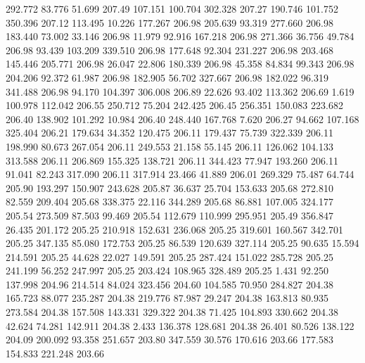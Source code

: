  292.772   83.776   51.699       207.49
 107.151  100.704  302.328       207.27
 190.746  101.752  350.396       207.12
 113.495   10.226  177.267       206.98
 205.639   93.319  277.660       206.98
 183.440   73.002   33.146       206.98
  11.979   92.916  167.218       206.98
 271.366   36.756   49.784       206.98
  93.439  103.209  339.510       206.98
 177.648   92.304  231.227       206.98
 203.468  145.446  205.771       206.98
  26.047   22.806  180.339       206.98
  45.358   84.834   99.343       206.98
 204.206   92.372   61.987       206.98
 182.905   56.702  327.667       206.98
 182.022   96.319  341.488       206.98
  94.170  104.397  306.008       206.89
  22.626   93.402  113.362       206.69
   1.619  100.978  112.042       206.55
 250.712   75.204  242.425       206.45
 256.351  150.083  223.682       206.40
 138.902  101.292   10.984       206.40
 248.440  167.768    7.620       206.27
  94.662  107.168  325.404       206.21
 179.634   34.352  120.475       206.11
 179.437   75.739  322.339       206.11
 198.990   80.673  267.054       206.11
 249.553   21.158   55.145       206.11
 126.062  104.133  313.588       206.11
 206.869  155.325  138.721       206.11
 344.423   77.947  193.260       206.11
  91.041   82.243  317.090       206.11
 317.914   23.466   41.889       206.01
 269.329   75.487   64.744       205.90
 193.297  150.907  243.628       205.87
  36.637   25.704  153.633       205.68
 272.810   82.559  209.404       205.68
 338.375   22.116  344.289       205.68
  86.881  107.005  324.177       205.54
 273.509   87.503   99.469       205.54
 112.679  110.999  295.951       205.49
 356.847   26.435  201.172       205.25
 210.918  152.631  236.068       205.25
 319.601  160.567  342.701       205.25
 347.135   85.080  172.753       205.25
  86.539  120.639  327.114       205.25
  90.635   15.594  214.591       205.25
  44.628   22.027  149.591       205.25
 287.424  151.022  285.728       205.25
 241.199   56.252  247.997       205.25
 203.424  108.965  328.489       205.25
   1.431   92.250  137.998       204.96
 214.514   84.024  323.456       204.60
 104.585   70.950  284.827       204.38
 165.723   88.077  235.287       204.38
 219.776   87.987   29.247       204.38
 163.813   80.935  273.584       204.38
 157.508  143.331  329.322       204.38
  71.425  104.893  330.662       204.38
  42.624   74.281  142.911       204.38
   2.433  136.378  128.681       204.38
  26.401   80.526  138.122       204.09
 200.092   93.358  251.657       203.80
 347.559   30.576  170.616       203.66
 177.583  154.833  221.248       203.66
